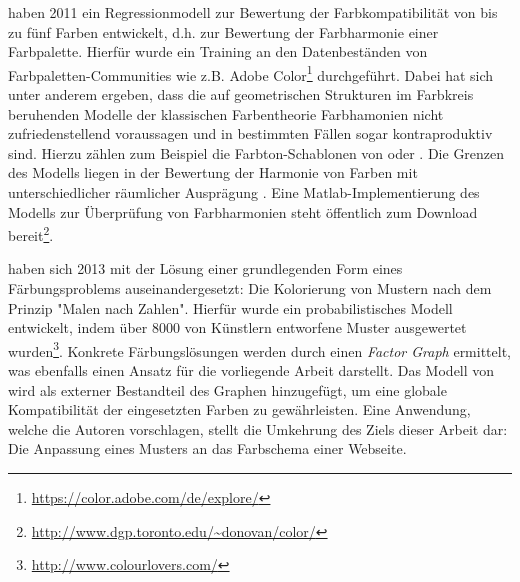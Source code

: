 \citet{colorcomp} haben 2011 ein Regressionmodell zur Bewertung der Farbkompatibilität von bis zu fünf Farben entwickelt, d.h. zur Bewertung der Farbharmonie einer Farbpalette. Hierfür wurde ein Training an den Datenbeständen von Farbpaletten-Communities wie z.B. Adobe Color\footnote{\url{https://color.adobe.com/de/explore/}} durchgeführt. Dabei hat sich unter anderem ergeben, dass die auf geometrischen Strukturen im Farbkreis beruhenden Modelle der klassischen Farbentheorie Farbhamonien nicht zufriedenstellend voraussagen und in bestimmten Fällen sogar kontraproduktiv sind. Hierzu zählen zum Beispiel die Farbton-Schablonen von \citet{itten} oder \citet{munsell}. Die Grenzen des Modells liegen in der Bewertung der Harmonie von Farben mit unterschiedlicher räumlicher Ausprägung \citep{webpage, patterns}. Eine Matlab-Implementierung des Modells zur Überprüfung von Farbharmonien steht öffentlich zum Download bereit\footnote{\url{http://www.dgp.toronto.edu/~donovan/color/}}.

\citet{patterns} haben sich 2013 mit der Lösung einer grundlegenden Form eines Färbungsproblems auseinandergesetzt: Die Kolorierung von Mustern nach dem Prinzip "Malen nach Zahlen". Hierfür wurde ein probabilistisches Modell entwickelt, indem über 8000 von Künstlern entworfene Muster ausgewertet wurden\footnote{\url{http://www.colourlovers.com/}}. Konkrete Färbungslösungen werden durch einen \emph{Factor Graph} ermittelt, was ebenfalls einen Ansatz für die vorliegende Arbeit darstellt. Das Modell von \citet{colorcomp} wird als externer Bestandteil des Graphen hinzugefügt, um eine globale Kompatibilität der eingesetzten Farben zu gewährleisten. Eine Anwendung, welche die Autoren vorschlagen, stellt die Umkehrung des Ziels dieser Arbeit dar: Die Anpassung eines Musters an das Farbschema einer Webseite.

